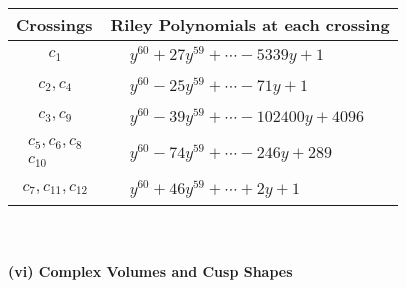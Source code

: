 \documentclass[1p]{elsarticle_modified}
\theoremstyle{definition}
\begin{document}
\begin{tabular}{m{50pt}|m{274pt}}
Crossings & \hspace{64pt}Riley Polynomials at each crossing \\
\hline $$\begin{aligned}c_{1}\end{aligned}$$&$\begin{aligned}
&y^{60}+27 y^{59}+\cdots-5339 y+1
\end{aligned}$\\
\hline $$\begin{aligned}c_{2},c_{4}\end{aligned}$$&$\begin{aligned}
&y^{60}-25 y^{59}+\cdots-71 y+1
\end{aligned}$\\
\hline $$\begin{aligned}c_{3},c_{9}\end{aligned}$$&$\begin{aligned}
&y^{60}-39 y^{59}+\cdots-102400 y+4096
\end{aligned}$\\
\hline $$\begin{aligned}c_{5},c_{6},c_{8}\\c_{10}\end{aligned}$$&$\begin{aligned}
&y^{60}-74 y^{59}+\cdots-246 y+289
\end{aligned}$\\
\hline $$\begin{aligned}c_{7},c_{11},c_{12}\end{aligned}$$&$\begin{aligned}
&y^{60}+46 y^{59}+\cdots+2 y+1
\end{aligned}$\\
\hline
\end{tabular}\\~\\
\newpage\flushleft \textbf{(vi) Complex Volumes and Cusp Shapes}
\end{document}
